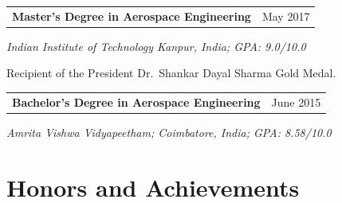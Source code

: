 \documentclass[10pt,a4paper]{article}
\makeatletter
\newcommand{\grantheading}[2]{%
\begin{tabularx}{\textwidth}{
    @{}
    >{\raggedright\arraybackslash}X
    >{\raggedleft\arraybackslash}p{4.5cm}
    @{}
}
\textbf{#1} & #2
\end{tabularx}
}
\makeatother
\begin{document}


\grantheading
{Master's Degree in Aerospace Engineering}
{May 2017}
\emph{Indian Institute of Technology Kanpur, India;
GPA: 9.0/10.0}

{\color{entrylight}
\vspace{-1.0mm}Recipient of the President Dr.\ Shankar Dayal Sharma Gold Medal.
\par}



\grantheading
{Bachelor's Degree in Aerospace Engineering}
{June 2015}
\emph{Amrita Vishwa Vidyapeetham; Coimbatore, India;
GPA: 8.58/10.0}
\section{Honors and Achievements}

\begingroup
\setlength{\tabcolsep}{0pt}
\renewcommand{\arraystretch}{0.216}
\end{document}
